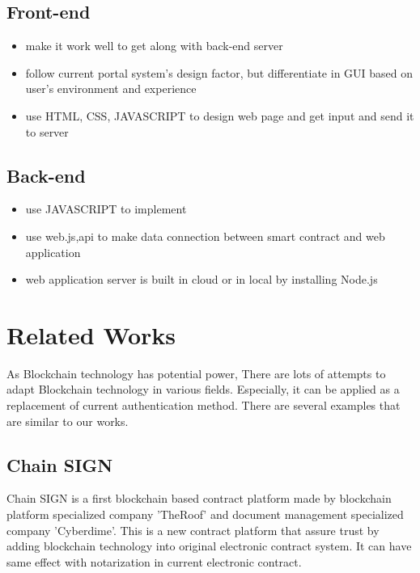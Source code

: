 \documentclass[conference]{IEEEtran}
\begin{document}
\subsection{Front-end}
\begin{itemize}
\item make it work well to get along with back-end server
\item follow current portal system's design factor, but differentiate in GUI based on user's environment and experience 
\item use HTML, CSS, JAVASCRIPT to design web page and get input and send it to server
\end{itemize}

\subsection{Back-end}
\begin{itemize}
\item use JAVASCRIPT to implement
\item use web.js,api to make data connection between smart contract and web application
\item web application server is built in cloud or in local by installing Node.js
\end{itemize}

\section{Related Works}
As Blockchain technology has potential power, There are lots of attempts to adapt Blockchain technology in various fields. Especially, it can be applied as a replacement of current authentication method. There are several examples that are similar to our works. 

\subsection{Chain SIGN}
Chain SIGN is a first blockchain based contract platform made by blockchain platform specialized company 'TheRoof' and document management specialized company 'Cyberdime'. This is a new contract platform that assure trust by adding blockchain technology into original electronic contract system. It can have same effect with notarization in current electronic contract.
\end{document}
